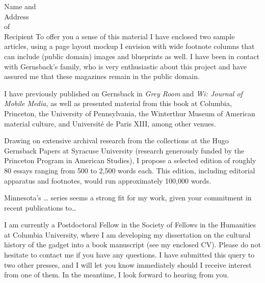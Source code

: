 \documentclass[fontsize=12pt, paper=a4]{scrlttr2}
\begin{document}
\begin{letter}{Name and \\ Address \\ of \\ Recipient}
To offer you a sense of this material I have enclosed two sample
articles, using a page layout mockup I envision with wide footnote
columns that can include (public domain) images and blueprints as well.
I have been in contact with Gernsback's family, who is very enthusiastic
about this project and have assured me that these magazines remain in
the public domain.

I have previously published on Gernsback in \emph{Grey Room} and
\emph{Wi: Journal of Mobile Media,} as well as presented material from
this book at Columbia, Princeton, the University of Pennsylvania, the
Winterthur Museum of American material culture, and Université de Paris
XIII, among other venues.

Drawing on extensive archival research from the collections at the Hugo
Gernsback Papers at Syracuse University (research generously funded by
the Princeton Program in American Studies), I propose a selected edition
of roughly 80 essays ranging from 500 to 2,500 words each. This edition,
including editorial apparatus and footnotes, would run approximately
100,000 words.

Minnesota's \ldots{} series seems a strong fit for my work, given your
commitment in recent publications to\ldots{}

I am currently a Postdoctoral Fellow in the Society of Fellows in the
Humanities at Columbia University, where I am developing my dissertation
on the cultural history of the gadget into a book manuscript (see my
enclosed CV). Please do not hesitate to contact me if you have any
questions. I have submitted this query to two other presses, and I will
let you know immediately should I receive interest from one of them. In
the meantime, I look forward to hearing from you.

\closing{} %

\end{letter}
\end{document}
